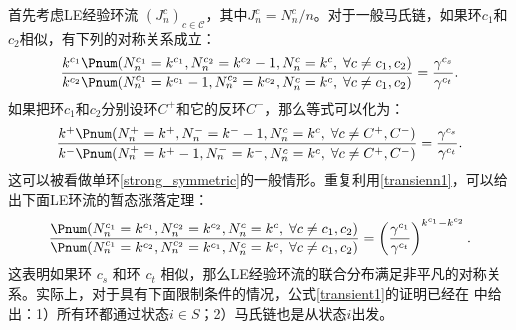 首先考虑LE经验环流 $(J^c_n)_{c\in\mathcal{C}}$，其中$J_n^c=N_n^c/n$。对于一般马氏链，如果环$c_1$和$c_2$相似，有下列的对称关系成立：
\begin{equation}\label{transienn1}
    \frac{k^{c_1} \Pnum(N^{c_1}_n=k^{c_1},N^{c_2}_n=k^{c_2}-1,N^{c}_n=k^{c},\;\forall c\neq c_1,c_2)}
    {k^{c_2} \Pnum(N^{c_1}_n=k^{c_1} -1,N^{c_2}_n=k^{c_2},N^{c}_n=k^{c},\;\forall c\neq c_1,c_2)}
    = \frac{\gamma^{c_s}}{\gamma^{c_t}}.
\end{equation}
如果把环$c_1$和$c_2$分别设环$C^+$和它的反环$C^-$，那么等式可以化为：
\begin{equation*}
    \frac{k^{+} \Pnum(N^{+}_n=k^{+},N^{-}_n=k^{-}-1,N^{c}_n=k^{c},\;\forall c\neq C^+,C^-)}
    {k^{-} \Pnum(N^{+}_n=k^{+} -1,N^{-}_n=k^{-},N^{c}_n=k^{c},\;\forall c\neq C^+,C^-)}
    = \frac{\gamma^{c_s}}{\gamma^{c_t}}.
\end{equation*}
这可以被看做单环\ref{strong_symmetric}的一般情形。重复利用\ref{transienn1}，可以给出下面LE环流的暂态涨落定理：
\begin{equation}\label{transient2}
    \frac{\Pnum(N^{c_1}_n=k^{c_1},N^{c_2}_n=k^{c_2},N^{c}_n=k^{c},\;\forall c\neq c_1,c_2)}
    {\Pnum(N^{c_1}_n=k^{c_2},N^{c_2}_n=k^{c_1},N^{c}_n=k^{c},\;\forall c\neq c_1,c_2)}
    = \left(\frac{\gamma^{c_1}}{\gamma^{c_t}}\right)^{k^{c_1}-k^{c_2}}.
\end{equation}
这表明如果环 $c_s$ 和环 $c_t$ 相似，那么LE经验环流的联合分布满足非平凡的对称关系。实际上，对于具有下面限制条件的情况，公式\ref{transient1}的证明已经在 \cite{jia2016cycle}中给出：1）所有环都通过状态$i\in S$；2）马氏链也是从状态$i$出发。

